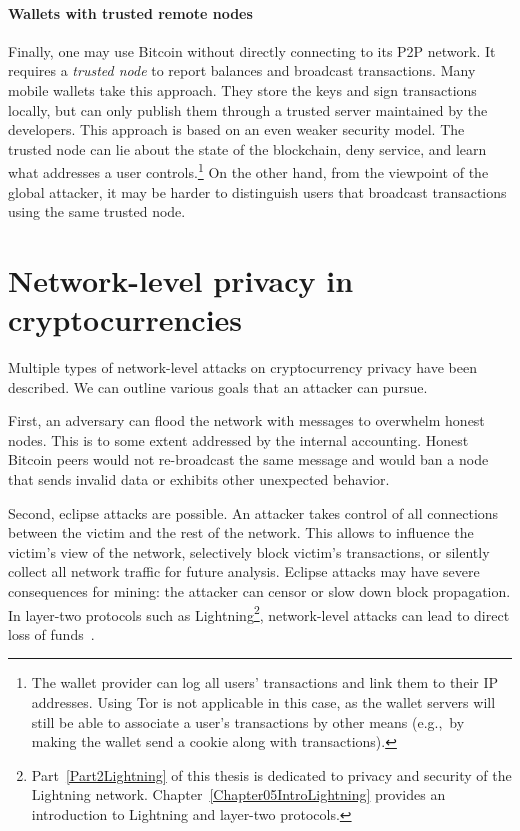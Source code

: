 \paragraph{Wallets with trusted remote nodes}
Finally, one may use Bitcoin without directly connecting to its P2P network.
It requires a \textit{trusted node} to report balances and broadcast transactions.
Many mobile wallets take this approach.
They store the keys and sign transactions locally, but can only publish them through a trusted server maintained by the developers.
This approach is based on an even weaker security model.
The trusted node can lie about the state of the blockchain, deny service, and learn what addresses a user controls.\footnote{The wallet provider can log all users' transactions and link them to their IP addresses. Using Tor is not applicable in this case, as the wallet servers will still be able to associate a user's transactions by other means (e.g.,~by making the wallet send a cookie along with transactions).}
On the other hand, from the viewpoint of the global attacker, it may be harder to distinguish users that broadcast transactions using the same trusted node.



\section{Network-level privacy in cryptocurrencies}

Multiple types of network-level attacks on cryptocurrency privacy have been described.
We can outline various goals that an attacker can pursue.

First, an adversary can flood the network with messages to overwhelm honest nodes.
This is to some extent addressed by the internal accounting.
Honest Bitcoin peers would not re-broadcast the same message and would ban a node that sends invalid data or exhibits other unexpected behavior.

Second, eclipse attacks are possible.
An attacker takes control of all connections between the victim and the rest of the network.
This allows to influence the victim's view of the network, selectively block victim's transactions, or silently collect all network traffic for future analysis.
Eclipse attacks may have severe consequences for mining: the attacker can censor or slow down block propagation.
In layer-two protocols such as Lightning\footnote{Part~\ref{Part2Lightning} of this thesis is dedicated to privacy and security of the Lightning network. Chapter~\ref{Chapter05IntroLightning} provides an introduction to Lightning and layer-two protocols.}, network-level attacks can lead to direct loss of funds~\cite{Riard2020}.

